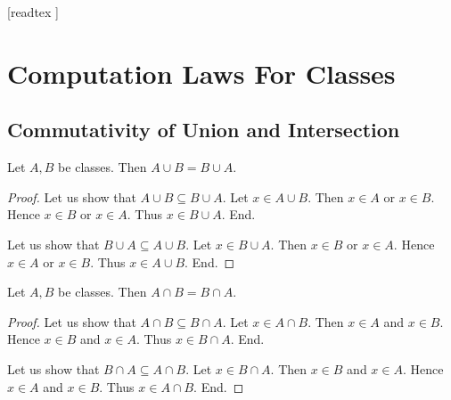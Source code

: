 \documentclass[10pt]{article}
\begin{document}
  \begin{imports}
    \begin{forthel}
      [readtex ]
    \end{forthel}
  \end{imports}


  \section*{Computation Laws For Classes}

  \subsection*{Commutativity of Union and Intersection}

  \begin{forthel}
    \begin{proposition}[id=FOUNDATIONS_02_8446177632583680,printid]
      Let $A, B$ be classes.
      Then $A \cup B = B \cup A$.
    \end{proposition}
    \begin{proof}
      Let us show that $A \cup B \subseteq B \cup A$.
        Let $x \in A \cup B$.
        Then $x \in A$ or $x \in B$.
        Hence $x \in B$ or $x \in A$.
        Thus $x \in B \cup A$.
      End.

      Let us show that $B \cup A \subseteq A \cup B$.
        Let $x \in B \cup A$.
        Then $x \in B$ or $x \in A$.
        Hence $x \in A$ or $x \in B$.
        Thus $x \in A \cup B$.
      End.
    \end{proof}
  \end{forthel}

  \begin{forthel}
    \begin{proposition}[id=FOUNDATIONS_02_7565102251245568,printid]
      Let $A, B$ be classes.
      Then $A \cap B = B \cap A$.
    \end{proposition}
    \begin{proof}
      Let us show that $A \cap B \subseteq B \cap A$.
        Let $x \in A \cap B$.
        Then $x \in A$ and $x \in B$.
        Hence $x \in B$ and $x \in A$.
        Thus $x \in B \cap A$.
      End.

      Let us show that $B \cap A \subseteq A \cap B$.
        Let $x \in B \cap A$.
        Then $x \in B$ and $x \in A$.
        Hence $x \in A$ and $x \in B$.
        Thus $x \in A \cap B$.
      End.
    \end{proof}
  \end{forthel}
\end{document}
